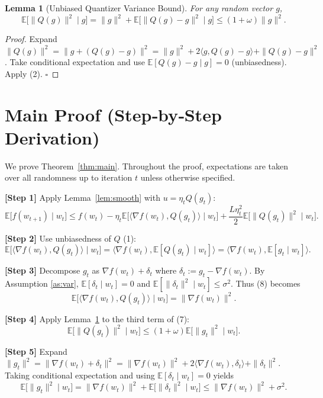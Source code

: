 \documentclass{article}
\newtheorem{lemma}{Lemma}
\newcommand{\EE}{\mathbb{E}}
\begin{document}
\begin{lemma}[Unbiased Quantizer Variance Bound]\label{lem:quant}
For any random vector $g$,
\[
\EE\!\big[\|Q(g)\|^{2}\mid g\big]
= \|g\|^{2}+\EE\!\big[\|Q(g)-g\|^{2}\mid g\big]
\le (1+\omega)\|g\|^{2}. \tag{6}
\]
\end{lemma}
\begin{proof}
Expand $\|Q(g)\|^{2}= \|g+(Q(g)-g)\|^{2}= \|g\|^{2}+2\langle g,Q(g)-g\rangle+\|Q(g)-g\|^{2}$.  
Take conditional expectation and use $\EE[Q(g)-g\mid g]=0$ (unbiasedness). Apply (2). \hfill $\square$
\end{proof}

\section*{Main Proof (Step‑by‑Step Derivation)}
We prove Theorem~\ref{thm:main}. Throughout the proof, expectations are taken over all randomness up to iteration $t$ unless otherwise specified.

\noindent\textbf{[Step 1]} Apply Lemma~\ref{lem:smooth} with $u=\eta_t Q(g_t)$:
\[
\EE\big[f(w_{t+1})\mid w_t\big]
\le f(w_t)-\eta_t\EE\!\big[\langle\nabla f(w_t),Q(g_t)\rangle\mid w_t\big]
+\frac{L\eta_t^{2}}{2}\EE\!\big[\|Q(g_t)\|^{2}\mid w_t\big]. \tag{7}
\]

\noindent\textbf{[Step 2]} Use unbiasedness of $Q$ (1):
\[
\EE\!\big[\langle\nabla f(w_t),Q(g_t)\rangle\mid w_t\big]
=\langle\nabla f(w_t),\EE[Q(g_t)\mid w_t]\rangle
=\langle\nabla f(w_t),\EE[g_t\mid w_t]\rangle. \tag{8}
\]

\noindent\textbf{[Step 3]} Decompose $g_t$ as $\nabla f(w_t)+\delta_t$ where $\delta_t:=g_t-\nabla f(w_t)$. By Assumption \ref{as:var}, $\EE[\delta_t\mid w_t]=0$ and $\EE[\|\delta_t\|^{2}\mid w_t]\le\sigma^{2}$.
Thus (8) becomes
\[
\EE\!\big[\langle\nabla f(w_t),Q(g_t)\rangle\mid w_t\big]
= \|\nabla f(w_t)\|^{2}. \tag{9}
\]

\noindent\textbf{[Step 4]} Apply Lemma~\ref{lem:quant} to the third term of (7):
\[
\EE\!\big[\|Q(g_t)\|^{2}\mid w_t\big]
\le (1+\omega)\EE\!\big[\|g_t\|^{2}\mid w_t\big]. \tag{10}
\]

\noindent\textbf{[Step 5]} Expand $\|g_t\|^{2}= \|\nabla f(w_t)+\delta_t\|^{2}
= \|\nabla f(w_t)\|^{2}+2\langle\nabla f(w_t),\delta_t\rangle+\|\delta_t\|^{2}$.
Taking conditional expectation and using $\EE[\delta_t\mid w_t]=0$ yields
\[
\EE\!\big[\|g_t\|^{2}\mid w_t\big]
= \|\nabla f(w_t)\|^{2}+ \EE\!\big[\|\delta_t\|^{2}\mid w_t\big]
\le \|\nabla f(w_t)\|^{2}+ \sigma^{2}. \tag{11}
\]
\end{document}
